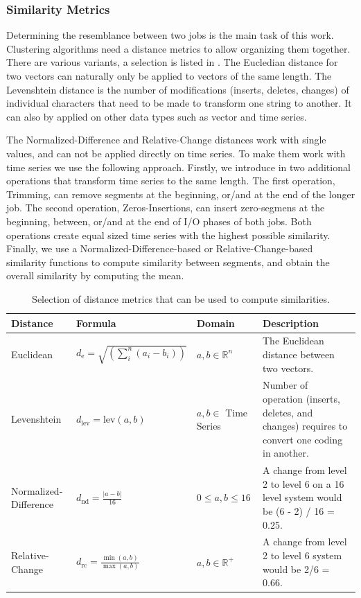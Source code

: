 \documentclass{jhps}
\begin{document}
\subsubsection{Similarity Metrics}
Determining the resemblance between two jobs is the main task of this work.
Clustering algorithms need a distance metrics to allow organizing them together.
There are various variants, a selection is listed in .
The Eucledian distance for two vectors can naturally only be applied to vectors of the same length.
The Levenshtein distance is the number of modifications (inserts, deletes, changes) of individual characters that need to be made to transform one string to another.
It can also by applied on other data types such as vector and time series.

The Normalized-Difference and Relative-Change distances work with single values, and can not be applied directly on time series.
To make them work with time series we use the following approach.
Firstly, we introduce in  two additional operations that transform time series to the same length.
The first operation, Trimming, can remove segments at the beginning, or/and at the end of the longer job.
The second operation, Zeros-Insertions, can insert zero-segmens at the beginning, between, or/and at the end of I/O phases of both jobs.
Both operations create equal sized time series with the highest possible similarity.
Finally, we use a Normalized-Difference-based or Relative-Change-based similarity functions to compute similarity between segments, and obtain the overall similarity by computing the mean.

\begin{table}
  \centering
  \begin{tabularx}{\textwidth}{lllX}
    Distance              & Formula                                       & Domain                  & Description                                                                                    \\
    \midrule
    Euclidean             & $d_{\text{e}} =\sqrt{(\sum_i^n (a_i - b_i))}$ & $a, b \in \mathbb{R}^n$ & The Euclidean distance between two vectors.                                                    \\
    Levenshtein           & $d_{\text{lev}} = \text{lev}(a, b)$           & $a, b \in$ Time Series  & Number of operation (inserts, deletes, and changes) requires to convert one coding in another. \\
    Normalized-Difference & $d_{\text{nd}} = \frac{|a - b|}{16}$          & $0 \le a, b \le 16$     & A change from level 2 to level 6 on a 16 level system would be (6 - 2) / 16 = 0.25.            \\
    Relative-Change       & $d_{\text{rc}} = \frac{\min(a,b)}{\max(a,b)}$ & $a, b \in \mathbb{R}^+$ & A change from level 2 to level 6 system would be 2/6 = 0.66.                                   \\
  \end{tabularx}
  \caption{Selection of distance metrics that can be used to compute similarities.}
  \label{tab:sim_funcs}
\end{table}
\end{document}
